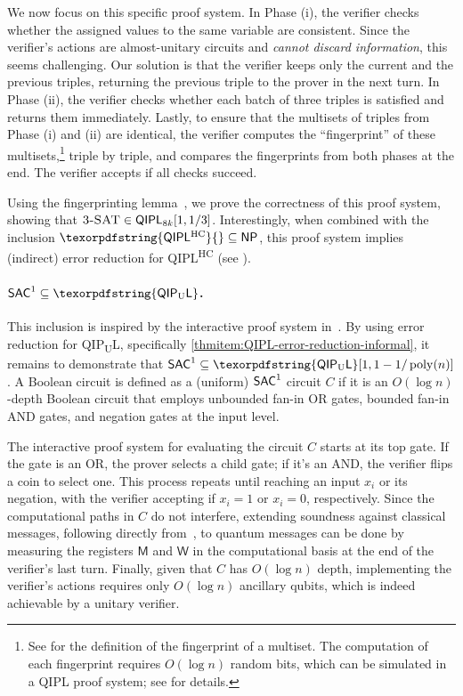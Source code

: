 \documentclass[11pt, a4paper]{article}
\numberwithin{equation}{section}
\numberwithin{figure}{section}
\newcommand{\NP}{\textnormal{\textsf{NP}}\xspace}
\newcommand{\QIPL}{\textnormal{\textsf{QIPL}}\xspace}
\newcommand{\QIPUL}{\texorpdfstring{\textnormal{\textsf{QIP}\textsubscript{\textnormal{U}}\textsf{L}}}\xspace}
\newcommand{\QIPLHC}{\texorpdfstring{\textnormal{\textsf{QIPL}\textsuperscript{\textnormal{HC}}}}\xspace}
\newcommand{\SAC}{\textnormal{\textsf{SAC}}\xspace}
\newcommand{\threeSAT}{\textnormal{\textsc{3-SAT}}\xspace}
\DeclareMathOperator\poly{poly}
\newcommand{\sfM}{\mathsf{M}}
\newcommand{\sfW}{\mathsf{W}}
\begin{document}
We now focus on this specific proof system. In Phase (i), the verifier checks whether the assigned values to the same variable are consistent. Since the verifier's actions are almost-unitary circuits and \textit{cannot discard information}, this seems challenging. Our solution is that the verifier keeps only the current and the previous triples, returning the previous triple to the prover in the next turn. In Phase (ii), the verifier checks whether each batch of three triples is satisfied and returns them immediately. 
Lastly, to ensure that the multisets of triples from Phase (i) and (ii) are identical, the verifier computes the ``fingerprint'' of these multisets,\footnote{See  for the definition of the fingerprint of a multiset. The computation of each fingerprint requires $O(\log n)$ random bits, which can be simulated in a \QIPL{} proof system; see  for details.} triple by triple, and compares the fingerprints from both phases at the end. 
The verifier accepts if all checks succeed. 

Using the fingerprinting lemma~\cite{Lipton90}, we prove the correctness of this proof system, showing that $\threeSAT{} \in \QIPL_{8k}[1,1/3]$. 
Interestingly, when combined with the inclusion $\QIPLHC{} \subseteq \NP{}$, this proof system implies (indirect) error reduction for \QIPLHC{} (see ). 

\paragraph{$\SAC^1 \subseteq \QIPUL$.} This inclusion is inspired by the interactive proof system in~\cite[Section 3.4]{Fortnow89}. By using error reduction for \QIPUL{}, specifically \ref{thmitem:QIPL-error-reduction-informal}, it remains to demonstrate that $\SAC^1 \subseteq \QIPUL[1,1-1/\poly(n)]$. 
A Boolean circuit is defined as a (uniform) $\SAC^1$ circuit $C$ if it is an $O(\log{n})$-depth Boolean circuit that employs unbounded fan-in OR gates, bounded fan-in AND gates, and negation gates at the input level. 

The interactive proof system for evaluating the circuit $C$ starts at its top gate. If the gate is an OR, the prover selects a child gate; if it's an AND, the verifier flips a coin to select one. This process repeats until reaching an input $x_i$ or its negation, with the verifier accepting if $x_i=1$ or $x_i=0$, respectively.
Since the computational paths in $C$ do not interfere, extending soundness against classical messages, following directly from~\cite[Section 3.4]{Fortnow89}, to quantum messages can be done by measuring the registers $\sfM$ and $\sfW$ in the computational basis at the end of the verifier's last turn. Finally, given that $C$ has $O(\log{n})$ depth, implementing the verifier's actions requires only $O(\log n)$ ancillary qubits, which is indeed achievable by a unitary verifier. 
\end{document}
